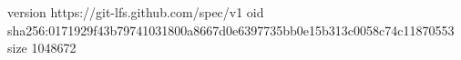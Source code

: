 version https://git-lfs.github.com/spec/v1
oid sha256:0171929f43b79741031800a8667d0e6397735bb0e15b313c0058c74c11870553
size 1048672

